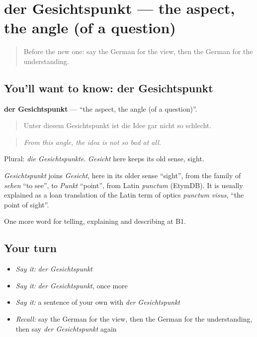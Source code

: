 \section[der Gesichtspunkt]{der Gesichtspunkt — the aspect, the angle (of a question)}

\label{lesson:GE-C330-gesichtspunkt}



\begin{quote}
Before the new one: say the German for the view, then the German for the understanding.
\end{quote}

\subsection*{You'll want to know: der Gesichtspunkt}
\textbf{der Gesichtspunkt} — \textquotedblleft{}the aspect, the angle (of a question)\textquotedblright{}.

\begin{quote}
Unter diesem Gesichtspunkt ist die Idee gar nicht so schlecht.
\end{quote}

\begin{quote}
\emph{From this angle, the idea is not so bad at all.}
\end{quote}

Plural: \emph{die Gesichtspunkte}. \emph{Gesicht} here keeps its old sense, sight.

\begin{cousinweb}
\emph{Gesichtspunkt} joins \emph{Gesicht}, here in its older sense \textquotedblleft{}sight\textquotedblright{}, from the family of \emph{sehen} \textquotedblleft{}to see\textquotedblright{}, to \emph{Punkt} \textquotedblleft{}point\textquotedblright{}, from Latin \emph{punctum} (EtymDB). It is usually explained as a loan translation of the Latin term of optics \emph{punctum visus}, \textquotedblleft{}the point of sight\textquotedblright{}.
\end{cousinweb}

\begin{grammarlens}[title={What you've built}]
One more word for telling, explaining and describing at B1.
\end{grammarlens}

\subsection*{Your turn}
\begin{itemize}
\raggedright
  \item \emph{Say it:} \emph{der Gesichtspunkt}
  \item \emph{Say it:} \emph{der Gesichtspunkt}, once more
  \item \emph{Say it:} a sentence of your own with \emph{der Gesichtspunkt}
  \item \emph{Recall:} say the German for the view, then the German for the understanding, then say \emph{der Gesichtspunkt} again
\end{itemize}

